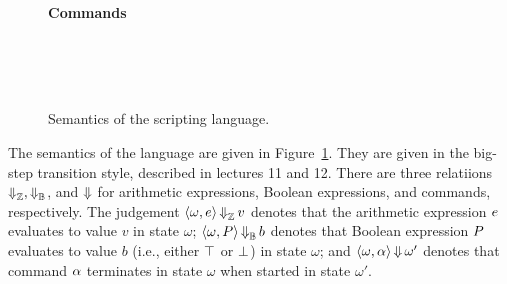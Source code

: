 \documentclass[11pt]{article}
\begin{document}
\begin{figure}[t]
\textbf{Commands}
\begin{center}
\quad
{}
\quad
{}
\\[1ex]
\quad
{}
\\[1ex]
\quad
{}
\quad
{}
\\[1ex]
\quad
{}
\end{center}

\caption{Semantics of the scripting language.}
\label{fig:semantics}
\end{figure}

The semantics of the language are given in Figure~\ref{fig:semantics}. They are given in the big-step transition style, described in lectures 11 and 12. There are three relatiions $\operatorname{\Downarrow}_{\mathbb{Z}}, \operatorname{\Downarrow}_{\mathbb{B}}$, and $\operatorname{\Downarrow}$ for arithmetic expressions, Boolean expressions, and commands, respectively. The judgement $\langle\omega,e\rangle \operatorname{\Downarrow}_{\mathbb{Z}} v$ denotes that the arithmetic expression $e$ evaluates to value $v$ in state $\omega$; $\langle\omega,P\rangle \operatorname{\Downarrow}_{\mathbb{B}} b$ denotes that Boolean expression $P$ evaluates to value $b$ (i.e., either $\top$ or $\bot$) in state $\omega$; and $\langle\omega,\alpha\rangle\operatorname{\Downarrow}\omega'$ denotes that command $\alpha$ terminates in state $\omega$ when started in state $\omega'$.
\end{document}
